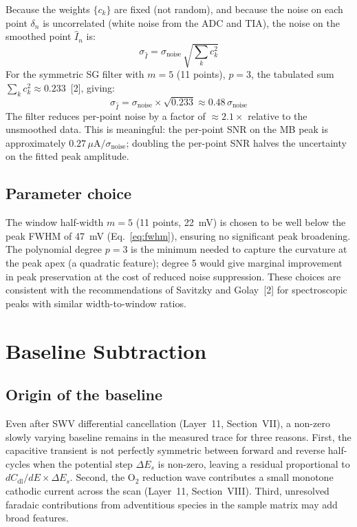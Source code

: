 \documentclass[10pt,a4paper]{article}
\numberwithin{equation}{section}
\newcommand{\cit}[1]{[#1]}
\begin{document}
Because the weights $\{c_k\}$ are fixed (not random), and because the noise
on each point $\delta_n$ is uncorrelated (white noise from the ADC and TIA),
the noise on the smoothed point $\hat{I}_n$ is:
\begin{equation}
  \sigma_{\hat{I}} = \sigma_\text{noise}\,\sqrt{\sum_{k} c_k^2}
  \label{eq:sgnoise}
\end{equation}
For the symmetric SG filter with $m = 5$ (11 points), $p = 3$, the tabulated
sum $\sum_k c_k^2 \approx 0.233$~\cit{2}, giving:
\begin{equation}
  \sigma_{\hat{I}} = \sigma_\text{noise} \times \sqrt{0.233} \approx 0.48\,\sigma_\text{noise}
  \label{eq:sgnoise_val}
\end{equation}
The filter reduces per-point noise by a factor of $\approx 2.1\times$
relative to the unsmoothed data. This is meaningful: the per-point SNR
on the MB peak is approximately $0.27\,\mu\text{A} / \sigma_\text{noise}$;
doubling the per-point SNR halves the uncertainty on the fitted peak
amplitude.

\subsection{Parameter choice}

The window half-width $m = 5$ (11 points, 22~mV) is chosen to be well below
the peak FWHM of 47~mV (Eq.~\ref{eq:fwhm}), ensuring no significant peak
broadening. The polynomial degree $p = 3$ is the minimum needed to capture
the curvature at the peak apex (a quadratic feature); degree 5 would give
marginal improvement in peak preservation at the cost of reduced noise
suppression. These choices are consistent with the recommendations of
Savitzky and Golay~\cit{2} for spectroscopic peaks with similar
width-to-window ratios.

\section{Baseline Subtraction}
\label{sec:baseline}

\subsection{Origin of the baseline}

Even after SWV differential cancellation (Layer~11, Section~VII), a
non-zero slowly varying baseline remains in the measured trace for three
reasons. First, the capacitive transient is not perfectly symmetric between
forward and reverse half-cycles when the potential step $\Delta E_s$ is
non-zero, leaving a residual proportional to $dC_\text{dl}/dE \times
\Delta E_s$. Second, the O$_2$ reduction wave contributes a small monotone
cathodic current across the scan (Layer~11, Section~VIII). Third, unresolved
faradaic contributions from adventitious species in the sample matrix may
add broad features.
\end{document}
